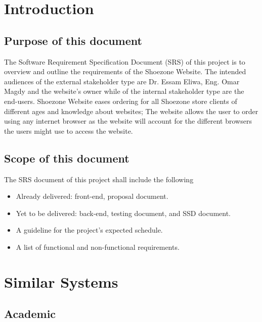 \documentclass[12pt]{article}
\begin{document}
\section{Introduction}
\subsection{Purpose of this document}
The Software Requirement Specification Document (SRS) of this project is to overview and outline the requirements of the Shoezone Website. The intended audiences of the external stakeholder type are Dr. Essam Eliwa, Eng. Omar Magdy and the website's owner while of the internal stakeholder type are the end-users. Shoezone Website eases ordering for all Shoezone store clients of different ages and knowledge about websites; The website allows the user to order using any internet browser as the website will account for the different browsers the users might use to access the website.
\subsection{Scope of this document}
The SRS document of this project shall include the following
\begin{itemize}
\item Already delivered: front-end, proposal document.
\item Yet to be delivered: back-end, testing document, and SSD document.
\item A guideline for the project's expected schedule.
\item A list of functional and non-functional requirements.
\end{itemize}





\section{Similar Systems}
\subsection{Academic}
\end{document}
